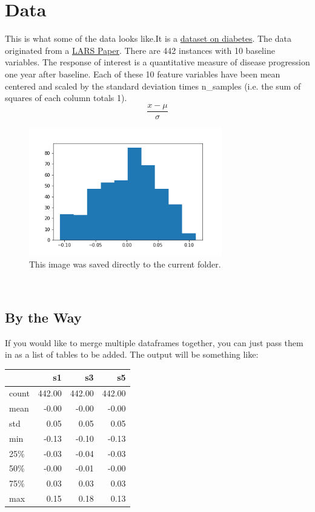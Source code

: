 \section{Data}%
\label{sec:Data}%
This is what some of the data looks like.It is a \href{https://scikit-learn.org/stable/datasets/index.html#diabetes-dataset}{dataset on diabetes}.
The data originated from a \href{https://www4.stat.ncsu.edu/~boos/var.select/diabetes.html}{LARS Paper}.
\newline
There are 442 instances with 10 baseline variables. The response of interest 
is a quantitative measure of disease progression one year after baseline.
\newline
Each of these 10 feature variables have been mean centered and scaled 
by the standard deviation times n\_samples 
(i.e. the sum of squares of each column totals 1).\\ 
\[\frac{x-\mu}{\sigma}\]

%

\begin{figure}[!ht]%
\centering%
\includegraphics[width=0.75\textwidth]{../figures/Figure2.png}%
\linebreak%
\caption{This image was saved directly to the current folder.}%
\end{figure}
\\
\lipsum[3-4]

\subsection{By the Way}
\label{subsec:byTheWay}
If you would like to merge multiple dataframes together, you can just pass them in
as a list of tables to be added. The output will be something like:
\begin{tabular}{lrrr}
\toprule
{} &     s1 &     s3 &     s5 \\
\midrule
count & 442.00 & 442.00 & 442.00 \\
mean  &  -0.00 &  -0.00 &  -0.00 \\
std   &   0.05 &   0.05 &   0.05 \\
min   &  -0.13 &  -0.10 &  -0.13 \\
25\%   &  -0.03 &  -0.04 &  -0.03 \\
50\%   &  -0.00 &  -0.01 &  -0.00 \\
75\%   &   0.03 &   0.03 &   0.03 \\
max   &   0.15 &   0.18 &   0.13 \\
\bottomrule
\end{tabular}
\\\caption{Merged dataframes example.}
